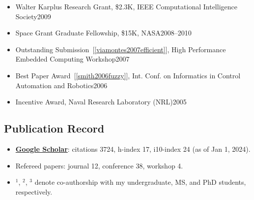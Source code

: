 \documentclass[11pt]{article}
\newcommand{\mygooglescholar}{\href{https://scholar.google.com/citations?user=TLcVQ-MAAAAJ}{Google Scholar}}
\begin{document}
\begin{itemize}
\item Walter Karplus Research Grant, \$2.3K, IEEE Computational Intelligence Society\hfill 2009 
\item Space Grant Graduate Fellowship, \$15K, NASA\hfill 2008--2010 
\item Outstanding Submission~[\ref{viamontes2007efficient}], High Performance Embedded Computing Workshop\hfill 2007
\item  Best Paper Award~[\ref{smith2006fuzzy}],  Int. Conf. on Informatics in Control Automation and Robotics\hfill 2006
\item Incentive Award,  Naval Research Laboratory (NRL)\hfill 2005
\end{itemize}

\subsection{Publication Record}

\begin{itemize}[label={},before=\small]
\item \textbf{\mygooglescholar{}}: citations 3724, h-index 17, i10-index 24 (as of Jan 1, 2024).
\item Refereed papers:  journal 12, conference 38, workshop 4.
\item \(^1\), \(^2\), \(^3\) denote co-authorship with my undergraduate, MS, and PhD students, respectively.
\end{itemize}
\end{document}
